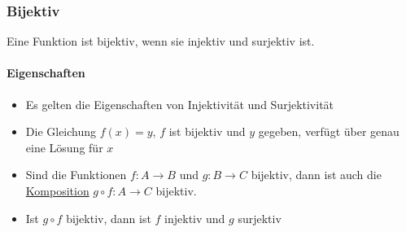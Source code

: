 \subsubsection{Bijektiv}
Eine Funktion ist bijektiv, wenn sie injektiv und surjektiv ist.


\paragraph{Eigenschaften}
\begin{itemize}
	\item Es gelten die Eigenschaften von Injektivität und Surjektivität
	\item Die Gleichung $f(x) = y$, $f$ ist bijektiv und $y$ gegeben, verfügt über genau eine Lösung für $x$
	\item Sind die Funktionen $f: A \rightarrow B$ und $g: B \rightarrow C$ bijektiv, dann ist auch die \underline{Komposition} $g \circ f: A \rightarrow C$ bijektiv.
	\item Ist $g \circ f$ bijektiv, dann ist $f$ injektiv und $g$ surjektiv
\end{itemize}

